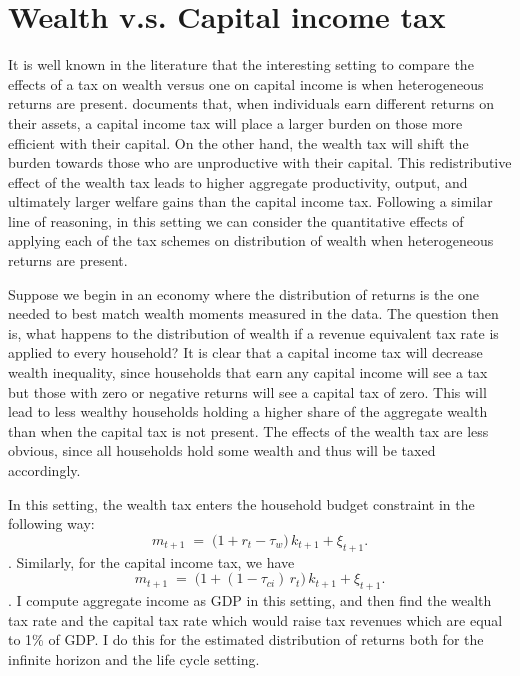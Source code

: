 \onlyinsubfile{\setcounter{section}{4}}
\section{Wealth v.s. Capital income tax}
\notinsubfile{\label{sec:Tax}}

\par It is well known in the literature that the interesting setting to compare the effects of a tax on wealth versus one on capital income is when heterogeneous returns are present. \cite{Guvenen2023} documents that, when individuals earn different returns on their assets, a capital income tax will place a larger burden on those more efficient with their capital. On the other hand, the wealth tax will shift the burden towards those who are unproductive with their capital. This redistributive effect of the wealth tax leads to higher aggregate productivity, output, and ultimately larger welfare gains than the capital income tax. Following a similar line of reasoning, in this setting we can consider the quantitative effects of applying each of the tax schemes on distribution of wealth when heterogeneous returns are present.

\par Suppose we begin in an economy where the distribution of returns is the one needed to best match wealth moments measured in the data. The question then is, what happens to the distribution of wealth if a revenue equivalent tax rate is applied to every household? It is clear that a capital income tax will decrease wealth inequality, since households that earn any capital income will see a tax but those with zero or negative returns will see a capital tax of zero. This will lead to less wealthy households holding a higher share of the aggregate wealth than when the capital tax is not present. The effects of the wealth tax are less obvious, since all households hold some wealth and thus will be taxed accordingly. 

\par In this setting, the wealth tax enters the household budget constraint in the following way:
\[
m_{t+1} \;=\; \big(1 + r_t - \tau_w\big)\,k_{t+1} + \xi_{t+1}.
\]. Similarly, for the capital income tax, we have
\[
m_{t+1} \;=\; \big(1 + (1-\tau_{ci})\,r_t\big)\,k_{t+1} + \xi_{t+1}.
\]. I compute aggregate income as GDP in this setting, and then find the wealth tax rate and the capital tax rate which would raise tax revenues which are equal to 1\% of GDP. I do this for the estimated distribution of returns both for the infinite horizon and the life cycle setting.

